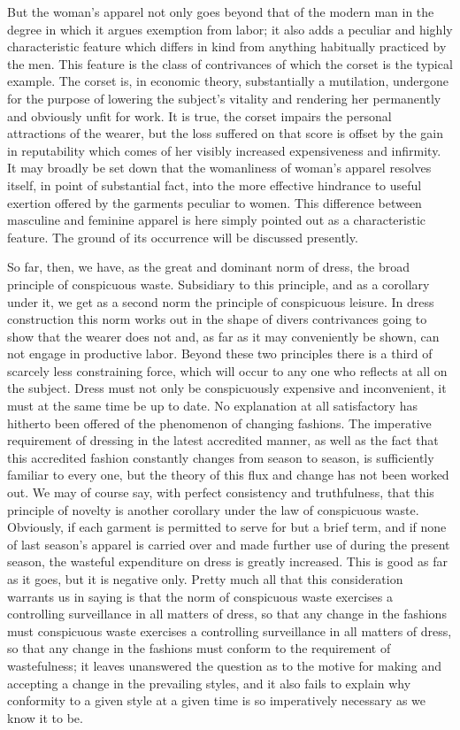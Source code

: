 \documentclass[12pt]{report}
\begin{document}
But the woman's apparel not only goes beyond that of the modern man
in the degree in which it argues exemption from labor; it also adds a
peculiar and highly characteristic feature which differs in kind from
anything habitually practiced by the men. This feature is the class of
contrivances of which the corset is the typical example. The corset
is, in economic theory, substantially a mutilation, undergone for the
purpose of lowering the subject's vitality and rendering her permanently
and obviously unfit for work. It is true, the corset impairs the
personal attractions of the wearer, but the loss suffered on that
score is offset by the gain in reputability which comes of her visibly
increased expensiveness and infirmity. It may broadly be set down
that the womanliness of woman's apparel resolves itself, in point of
substantial fact, into the more effective hindrance to useful exertion
offered by the garments peculiar to women. This difference between
masculine and feminine apparel is here simply pointed out as a
characteristic feature. The ground of its occurrence will be discussed
presently.

So far, then, we have, as the great and dominant norm of dress, the
broad principle of conspicuous waste. Subsidiary to this principle,
and as a corollary under it, we get as a second norm the principle of
conspicuous leisure. In dress construction this norm works out in the
shape of divers contrivances going to show that the wearer does not and,
as far as it may conveniently be shown, can not engage in productive
labor. Beyond these two principles there is a third of scarcely less
constraining force, which will occur to any one who reflects at all
on the subject. Dress must not only be conspicuously expensive and
inconvenient, it must at the same time be up to date. No explanation at
all satisfactory has hitherto been offered of the phenomenon of
changing fashions. The imperative requirement of dressing in the latest
accredited manner, as well as the fact that this accredited fashion
constantly changes from season to season, is sufficiently familiar to
every one, but the theory of this flux and change has not been worked
out. We may of course say, with perfect consistency and truthfulness,
that this principle of novelty is another corollary under the law of
conspicuous waste. Obviously, if each garment is permitted to serve for
but a brief term, and if none of last season's apparel is carried
over and made further use of during the present season, the wasteful
expenditure on dress is greatly increased. This is good as far as it
goes, but it is negative only. Pretty much all that this consideration
warrants us in saying is that the norm of conspicuous waste exercises a
controlling surveillance in all matters of dress, so that any change in
the fashions must conspicuous waste exercises a controlling surveillance
in all matters of dress, so that any change in the fashions must conform
to the requirement of wastefulness; it leaves unanswered the question
as to the motive for making and accepting a change in the prevailing
styles, and it also fails to explain why conformity to a given style at
a given time is so imperatively necessary as we know it to be.
\end{document}

